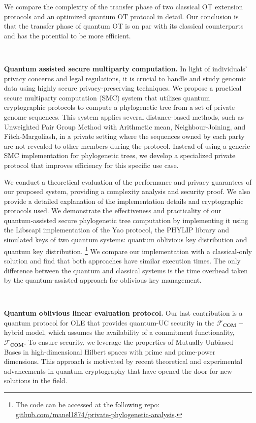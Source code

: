 We compare the complexity of the transfer phase of two classical OT extension protocols \cite{ALSZ13, KOS15} and an optimized quantum OT protocol in detail. Our conclusion is that the transfer phase of quantum OT is on par with its classical counterparts and has the potential to be more efficient.

\

\noindent\textbf{Quantum assisted secure multiparty computation.} In light of individuals' privacy concerns and legal regulations, it is crucial to handle and study genomic data using highly secure privacy-preserving techniques. We propose a practical secure multiparty computation (SMC) system that utilizes quantum cryptographic protocols to compute a phylogenetic tree from a set of private genome sequences. This system applies several distance-based methods, such as Unweighted Pair Group Method with Arithmetic mean, Neighbour-Joining, and Fitch-Margoliash, in a private setting where the sequences owned by each party are not revealed to other members during the protocol. Instead of using a generic SMC implementation for phylogenetic trees, we develop a specialized private protocol that improves efficiency for this specific use case.


We conduct a theoretical evaluation of the performance and privacy guarantees of our proposed system, providing a complexity analysis and security proof. We also provide a detailed explanation of the implementation details and cryptographic protocols used. We demonstrate the effectiveness and practicality of our quantum-assisted secure phylogenetic tree computation by implementing it using the Libscapi implementation of the Yao protocol, the PHYLIP library and simulated keys of two quantum systems: quantum oblivious key distribution and quantum key distribution. \footnote{ The code can be accessed at the following repo: \href{https://github.com/manel1874/private-phylogenetic-analysis}{github.com/manel1874/private-phylogenetic-analysis}.} We compare our implementation with a classical-only solution and find that both approaches have similar execution times. The only difference between the quantum and classical systems is the time overhead taken by the quantum-assisted approach for oblivious key management.

\

\noindent\textbf{Quantum oblivious linear evaluation protocol.} Our last contribution is a quantum protocol for OLE that provides quantum-UC security in the $\mathcal{F}_{\textbf{COM}}-$hybrid model, which assumes the availability of a commitment functionality, $\mathcal{F}_{\textbf{COM}}$. To ensure security, we leverage the properties of Mutually Unbiased Bases in high-dimensional Hilbert spaces with prime and prime-power dimensions. This approach is motivated by recent theoretical and experimental advancements in quantum cryptography \cite{BPT00,DEBZ10,Zhongetal2015,BHVBFHM18,DHMPPV21} that have opened the door for new solutions in the field.

